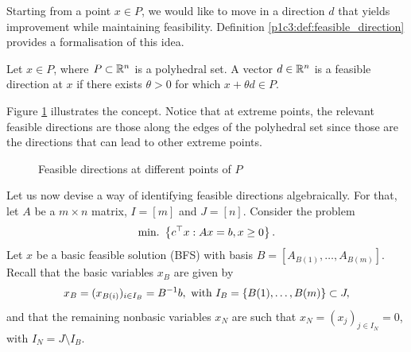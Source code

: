 Starting from a point $x \in P$, we would like to move in a direction $d$ that yields improvement while maintaining feasibility. Definition \ref{p1c3:def:feasible_direction} provides a formalisation of this idea.

\begin{definition} \label{p1c3:def:feasible_direction}
	Let $x \in P$, where $P \subset \mathbb{R}^n$ is a polyhedral set. A vector $d \in \mathbb{R}^n$ is a feasible direction at $x$ if there exists $\theta > 0$ for which $x + \theta d \in P$.
\end{definition}

Figure \ref{p1c3:fig:feasible_directions} illustrates the concept. Notice that at extreme points, the relevant feasible directions are those along the edges of the polyhedral set since those are the directions that can lead to other extreme points.
  
\begin{figure}[h]
	\caption{Feasible directions at different points of $P$} \label{p1c3:fig:feasible_directions}
\end{figure}

Let us now devise a way of identifying feasible directions algebraically. For that, let $A$ be a $m \times n$ matrix, $I = [m]$ and $J = [n]$. Consider the problem 
%
\begin{equation*}
	\mathop{\text{min.~}} \left\{ c^\top x : Ax = b, x \geq 0 \right \}.	
\end{equation*}
%
Let $x$ be a basic feasible solution (BFS) with basis $B = [A_{B(1)}, \dots, A_{B(m)}]$. Recall that the basic variables $x_B$ are given by
%
\begin{equation*}
	x_B = (x_{B(i)})_{i \in I_B} = B^{-1}b, \text{ with } I_B = \left\{ B(1), \dots, B(m) \right \} \subset J,	
\end{equation*}
%
and that the remaining nonbasic variables $x_N$ are such that $x_N = (x_j)_{j \in I_N} = 0$, with $I_N = J \setminus I_B$.


